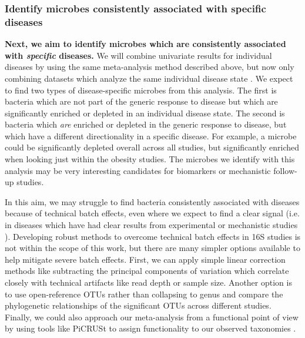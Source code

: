 \documentclass[12pt]{article}
\begin{document}
\subsubsection{Identify microbes consistently associated with specific diseases}
\textbf{Next, we aim to identify microbes which are consistently associated with \textit{specific}
diseases.} We will
combine univariate results for individual diseases by 
using the same meta-analysis method described above, but now only
combining datasets which analyze the same individual disease state \cite{zavkin-ztest-2011}. 
We expect to find two types of disease-specific microbes from this analysis.
The first is bacteria which are not part of the generic response to 
disease but which are significantly enriched or depleted in 
an individual disease state.
The second is bacteria which \textit{are} enriched or depleted in the generic
response to disease, but which have a different directionality
in a specific disease. For example,
a microbe could be significantly depleted overall across all studies,
but significantly enriched when looking just within the obesity studies.
The microbes we identify with this
analysis may be very interesting candidates for biomarkers or mechanistic follow-up studies.

In this aim, we may struggle to find bacteria consistently 
associated with diseases because of technical batch effects, even 
where we expect to find a clear signal (i.e. in diseases which have 
had clear results from experimental or mechanistic studies \cite{turnbaugh-energy_harvest-2006, ridaura-mouse_fmt-2013, crc_zeller}). 
Developing robust methods to overcome technical batch effects in 16S 
studies is not within the scope of this work, but there are many
simpler options available to help mitigate severe batch effects. 
First, we can apply simple linear correction methods 
like subtracting the principal components of variation which correlate closely with technical 
artifacts like read depth or sample size. 
Another option is to use open-reference OTUs rather than collapsing to genus
and compare the phylogenetic relationships of the significant OTUs across different studies. 
Finally, we could also approach our meta-analysis from a functional point of view by
using tools like PiCRUSt to assign functionality to our
observed taxonomies \cite{langille-picrust-2013}.
\end{document}
